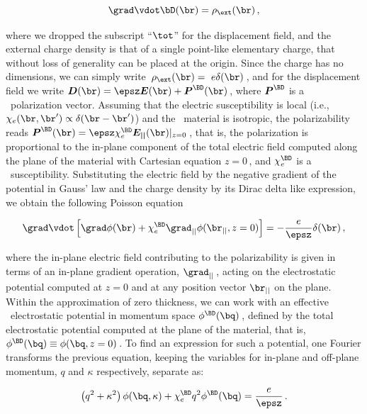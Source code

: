 \begin{equation}
    \grad \vdot \bD(\br) = \rho_\ext(\br)\,,
\end{equation}

\noindent where we dropped the subscript \enquote{$\tot$} for the displacement field, and the external charge density is that of a single point-like elementary charge, that without loss of generality can be placed at the origin.
Since the charge has no dimensions, we can simply write~$\rho_\ext (\br)=~e\delta (\br)$\,, and for the displacement field we write $\boldsymbol{D} (\br)=\epsz\boldsymbol{E} (\br)+\boldsymbol{P}^\BD (\br)$\,, where $\boldsymbol{P}^\BD$ is a \bd~polarization vector.
Assuming that the electric susceptibility is local (i.e., $\chi_{e}(\br,\br') \propto \delta(\br - \br')$) and the \bd~material is isotropic, the polarizability reads $\boldsymbol{P}^\BD (\br)=\epsz\chi_{e}^\BD\boldsymbol{E_{||}} (\br)|_{z=0}$\,,
that is, the polarization is proportional to the in-plane component of the total electric field computed along the plane of the material with Cartesian equation $z=0$\,, and $\chi_{e}^\BD$ is a \bd~susceptibility.
Substituting the electric field by the negative gradient of the potential in Gauss' law and the charge density by its Dirac delta like expression, we obtain the following Poisson equation

\begin{equation}
    \grad\vdot\left[\grad\phi (\br)+\chi_{e}^\BD\grad_{||}\phi(\br_{||},z=0)\right]=-\frac{e}{\epsz}\delta (\br)\,,
\end{equation}

\noindent where the in-plane electric field contributing to the polarizability is given in terms of an in-plane gradient operation, $\grad_{||}$\,, acting on the electrostatic potential computed at $z=0$ and at any position vector $\br_{||}$ on the plane.
Within the approximation of zero thickness, we can work with an effective \bd~electrostatic potential in momentum space $\phi^\BD(\bq)$\,, defined by the total electrostatic potential computed at the plane of the material, that is, $\phi^\BD(\bq)\equiv\phi(\bq,z=0)$\,.
To find an expression for such a potential, one Fourier transforms the previous equation, keeping the variables for in-plane and off-plane momentum, $q$ and $\kappa$ respectively, separate as:

\begin{equation}
    \left(q^2+\kappa^2\right)\phi(\bq,\kappa)+\chi_{e}^\BD q^2\phi^\BD(\bq)=\frac{e}{\epsz}\,.
\end{equation}

